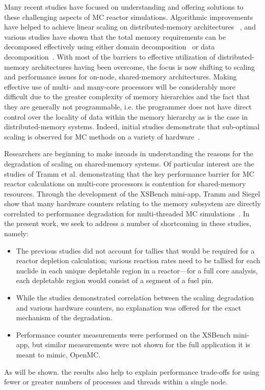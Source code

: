 \documentclass{mc2015}
\begin{document}
Many recent studies have focused on understanding and offering solutions to
these challenging aspects of MC reactor simulations. Algorithmic improvements
have helped to achieve linear scaling on distributed-memory
architectures~\cite{nse-romano-2012, ane-romano-2013} , and various studies have
shown that the total memory requirements can be decomposed effectively using
either domain decomposition~\cite{jcp-siegel-2012, jcp-siegel-2013,
  physor-horelik-2014, pc-horelik-2014} or data
decomposition~\cite{jcp-romano-2013}. With most of the barriers to effective
utilization of distributed-memory architectures having been overcome, the focus
is now shifting to scaling and performance issues for on-node, shared-memory
architectures. Making effective use of multi- and many-core processors will be
considerably more difficult due to the greater complexity of memory hierarchies
and the fact that they are generally not programmable, i.e. the programmer does
not have direct control over the locality of data within the memory hierarchy
as is the case in distributed-memory systems. Indeed, initial studies
demonstrate that sub-optimal scaling is observed for MC methods on a variety
of hardware~\cite{ijhpca-siegel-2014}.

Researchers are beginning to make inroads in understanding the reasons for the
degradation of scaling on shared-memory systems. Of particular interest are the
studies of Tramm et al. demonstrating that the key performance barrier for MC
reactor calculations on multi-core processors is contention for shared-memory
resources. Through the development of the XSBench mini-app, Tramm and
Siegel show that many hardware counters relating to the memory subsystem are
directly correlated to performance degradation for multi-threaded MC
simulations~\cite{physor-tramm-2014, ane-tramm-2014}. In the present work, we
seek to address a number of shortcoming in these studies, namely:
\begin{itemize}
\item The previous studies did not account for tallies that would be required
  for a reactor depletion calculation; various reaction rates need to be
  tallied for each nuclide in each unique depletable region in a reactor---for a
full core analysis, each depletable region would consist of a segment of a fuel pin.
\item While the studies demonstrated correlation between the scaling
  degradation and various hardware counters, no explanation was offered for
  the exact mechanism of the degradation.
\item Performance counter measurements were performed on the XSBench mini-app,
  but similar measurements were not shown for the full application it is meant
  to mimic, OpenMC.
\end{itemize}
As will be shown. the results also help to explain performance trade-offs for
using fewer or greater numbers of processes and threads within a single node.
\end{document}
